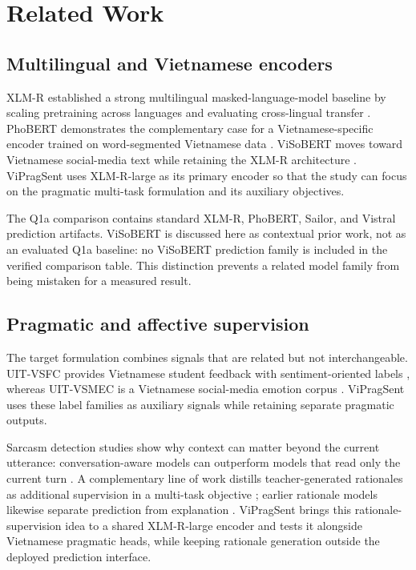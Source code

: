 \section{Related Work}

\subsection{Multilingual and Vietnamese encoders}
XLM-R established a strong multilingual masked-language-model baseline by scaling pretraining across languages and evaluating cross-lingual transfer \citep{conneau-etal-2020-unsupervised}. PhoBERT demonstrates the complementary case for a Vietnamese-specific encoder trained on word-segmented Vietnamese data \citep{nguyen-tuan-nguyen-2020-phobert}. ViSoBERT moves toward Vietnamese social-media text while retaining the XLM-R architecture \citep{nguyen-etal-2023-visobert}. ViPragSent uses XLM-R-large as its primary encoder so that the study can focus on the pragmatic multi-task formulation and its auxiliary objectives.

The Q1a comparison contains standard XLM-R, PhoBERT, Sailor, and Vistral prediction artifacts. ViSoBERT is discussed here as contextual prior work, not as an evaluated Q1a baseline: no ViSoBERT prediction family is included in the verified comparison table. This distinction prevents a related model family from being mistaken for a measured result.

\subsection{Pragmatic and affective supervision}
The target formulation combines signals that are related but not interchangeable. UIT-VSFC provides Vietnamese student feedback with sentiment-oriented labels \citep{vannguyen2018uitvsfc}, whereas UIT-VSMEC is a Vietnamese social-media emotion corpus \citep{ho2019emotion}. ViPragSent uses these label families as auxiliary signals while retaining separate pragmatic outputs.

Sarcasm detection studies show why context can matter beyond the current utterance: conversation-aware models can outperform models that read only the current turn \citep{ghosh-etal-2018-sarcasm}. A complementary line of work distills teacher-generated rationales as additional supervision in a multi-task objective \citep{hsieh-etal-2023-distilling}; earlier rationale models likewise separate prediction from explanation \citep{lei-etal-2016-rationalizing}. ViPragSent brings this rationale-supervision idea to a shared XLM-R-large encoder and tests it alongside Vietnamese pragmatic heads, while keeping rationale generation outside the deployed prediction interface.


